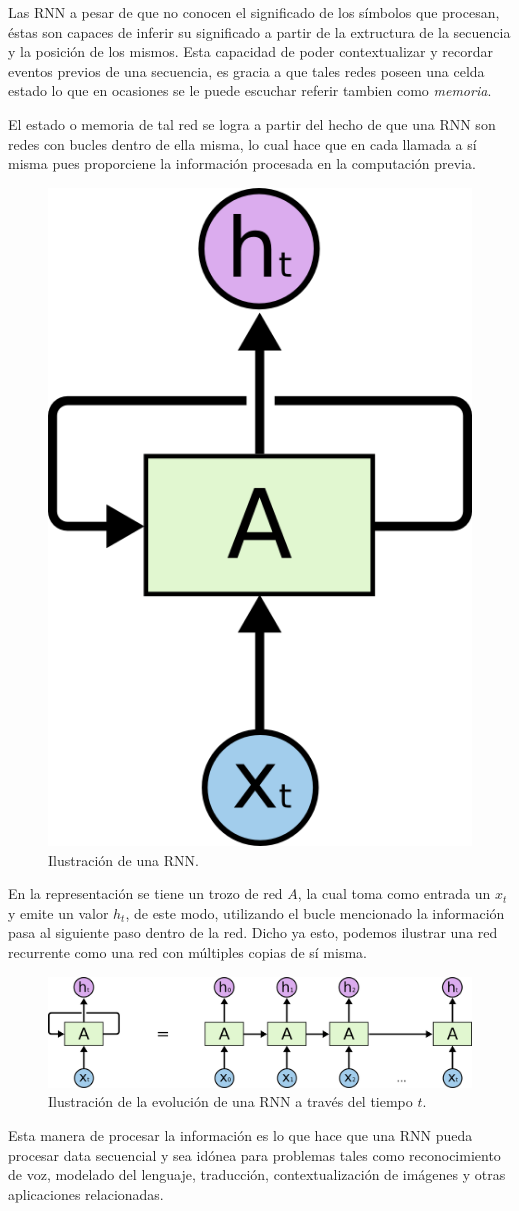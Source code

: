 \documentclass[12pt, letterpaper]{article}
\begin{document}
        Las RNN a pesar de que no conocen el significado de los símbolos que procesan, éstas son capaces de inferir su significado a partir de la extructura de la secuencia y la posición de los mismos. Esta capacidad de poder contextualizar y recordar eventos previos de una secuencia, es gracia a que tales redes poseen una celda estado lo que en ocasiones se le puede escuchar referir tambien como \emph{memoria}.
    
        El estado o memoria de tal red se logra a partir del hecho de que una RNN son redes con bucles dentro de ella misma, lo cual hace que en cada llamada a sí misma pues proporciene la información procesada en la computación previa.
    
        \begin{figure}[H]
            \centering
            \includegraphics[width=0.2\linewidth]{img/RNN-rolled.png}
            \caption{Ilustración de una RNN.}
        \end{figure}
    
        En la representación se tiene un trozo de red $A$, la cual toma como entrada un $x_t$ y emite un valor $h_t$, de este modo, utilizando el bucle mencionado la información pasa al siguiente paso dentro de la red. Dicho ya esto, podemos ilustrar una red recurrente como una red con múltiples copias de sí misma\cite{Understanding_LSTM}.
    
        \begin{figure}[H]
            \centering
            \includegraphics[width=\linewidth]{img/RNN-unrolled.png}
            \caption{Ilustración de la evolución de una RNN a través del tiempo $t$.}
        \end{figure}
        Esta manera de procesar la información es lo que hace que una RNN pueda procesar data secuencial y sea idónea para problemas tales como reconocimiento de voz, modelado del lenguaje, traducción, contextualización de imágenes y otras aplicaciones relacionadas\cite{rnn-effectiveness}.
\end{document}
